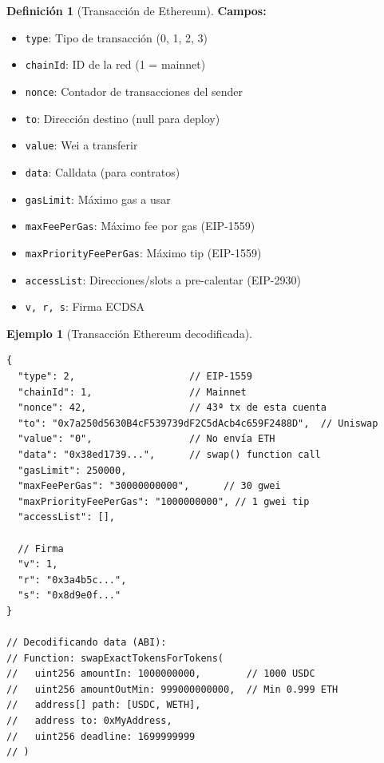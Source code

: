 \documentclass[11pt,a4paper,twoside,openright]{book}
\theoremstyle{definition}
\newtheorem{definition}{Definición}[chapter]
\newtheorem{example}{Ejemplo}[chapter]
\theoremstyle{plain}
\theoremstyle{remark}
\begin{document}
\begin{definition}[Transacción de Ethereum]
\textbf{Campos:}
\begin{itemize}
    \item \texttt{type}: Tipo de transacción (0, 1, 2, 3)
    \item \texttt{chainId}: ID de la red (1 = mainnet)
    \item \texttt{nonce}: Contador de transacciones del sender
    \item \texttt{to}: Dirección destino (null para deploy)
    \item \texttt{value}: Wei a transferir
    \item \texttt{data}: Calldata (para contratos)
    \item \texttt{gasLimit}: Máximo gas a usar
    \item \texttt{maxFeePerGas}: Máximo fee por gas (EIP-1559)
    \item \texttt{maxPriorityFeePerGas}: Máximo tip (EIP-1559)
    \item \texttt{accessList}: Direcciones/slots a pre-calentar (EIP-2930)
    \item \texttt{v, r, s}: Firma ECDSA
\end{itemize}
\end{definition}

\begin{example}[Transacción Ethereum decodificada]
\begin{verbatim}
{
  "type": 2,                    // EIP-1559
  "chainId": 1,                 // Mainnet
  "nonce": 42,                  // 43ª tx de esta cuenta
  "to": "0x7a250d5630B4cF539739dF2C5dAcb4c659F2488D",  // Uniswap
  "value": "0",                 // No envía ETH
  "data": "0x38ed1739...",      // swap() function call
  "gasLimit": 250000,
  "maxFeePerGas": "30000000000",      // 30 gwei
  "maxPriorityFeePerGas": "1000000000", // 1 gwei tip
  "accessList": [],
  
  // Firma
  "v": 1,
  "r": "0x3a4b5c...",
  "s": "0x8d9e0f..."
}

// Decodificando data (ABI):
// Function: swapExactTokensForTokens(
//   uint256 amountIn: 1000000000,        // 1000 USDC
//   uint256 amountOutMin: 999000000000,  // Min 0.999 ETH
//   address[] path: [USDC, WETH],
//   address to: 0xMyAddress,
//   uint256 deadline: 1699999999
// )
\end{verbatim}
\end{example}
\end{document}
